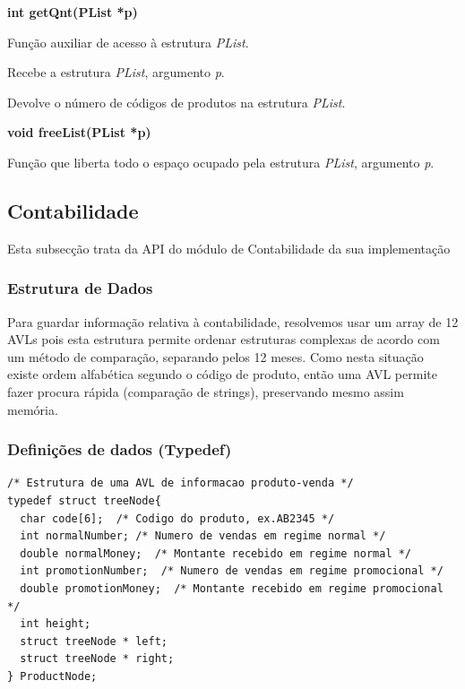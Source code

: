 \documentclass[10pt] {article}
\begin{document}
\noindent \textbf{int getQnt(PList *p)}
\par Função auxiliar de acesso à estrutura \emph{PList}.
\par Recebe a estrutura \emph{PList}, argumento \emph{p}.
\par Devolve o número de códigos de produtos na estrutura \emph{PList}.

\noindent \textbf{void freeList(PList *p)}
\par Função que liberta todo o espaço ocupado pela estrutura \emph{PList}, argumento \emph{p}.


\newpage
\subsection{Contabilidade}
\par Esta subsecção trata da API do módulo de Contabilidade da sua implementação

\subsubsection{Estrutura de Dados}
\par
Para guardar informação relativa à contabilidade, resolvemos usar um array de 12 AVLs pois esta estrutura permite ordenar estruturas complexas de acordo com um método de comparação, separando pelos 12 meses. Como nesta situação existe ordem alfabética segundo o código de produto, então uma AVL permite fazer procura rápida (comparação de strings), preservando mesmo assim memória.

\subsubsection{Definições de dados (Typedef)}

\begin{lstlisting}
/* Estrutura de uma AVL de informacao produto-venda */
typedef struct treeNode{
  char code[6];  /* Codigo do produto, ex.AB2345 */
  int normalNumber; /* Numero de vendas em regime normal */
  double normalMoney;  /* Montante recebido em regime normal */
  int promotionNumber;  /* Numero de vendas em regime promocional */
  double promotionMoney;  /* Montante recebido em regime promocional */
  int height;
  struct treeNode * left; 
  struct treeNode * right;
} ProductNode;
\end{lstlisting}
\end{document}

